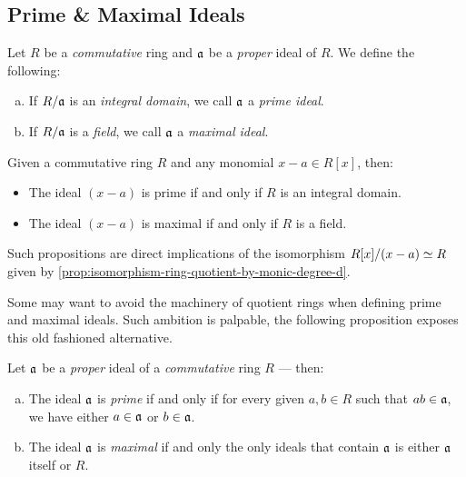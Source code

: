 \subsection{Prime \& Maximal Ideals}

\begin{definition}
    \label{def:prime-maximal-ideal}
    Let \(R\) be a \emph{commutative} ring and \(\mathfrak{a}\) be a \emph{proper}
    ideal of \(R\). We define the following:
    \begin{enumerate}[(a)]\setlength\itemsep{0em}
        \item If \(R/\mathfrak{a}\) is an \emph{integral domain}, we call \(\mathfrak{a}\) a
              \emph{prime ideal}.

        \item If \(R/\mathfrak{a}\) is a \emph{field}, we call \(\mathfrak{a}\) a
              \emph{maximal ideal}.
    \end{enumerate}
\end{definition}

\begin{example}
    \label{exp:prime-maximal-principal-ideal-of-R[x]}
    Given a commutative ring \(R\) and any monomial \(x - a \in R[x]\), then:
    \begin{itemize}\setlength\itemsep{0em}
        \item The ideal \((x - a)\) is prime if and only if \(R\) is an integral
              domain.
        \item The ideal \((x - a)\) is maximal if and only if \(R\) is a field.
    \end{itemize}
    Such propositions are direct implications of the isomorphism
    \(R[x]/(x - a) \simeq R\) given by
    \cref{prop:isomorphism-ring-quotient-by-monic-degree-d}.
\end{example}

Some may want to avoid the machinery of quotient rings when defining prime and
maximal ideals. Such ambition is palpable, the following proposition exposes
this old fashioned alternative.

\begin{proposition}
    \label{prop:equivalent-prime-maximal-ideals}
    Let \(\mathfrak{a}\) be a \emph{proper} ideal of a \emph{commutative} ring
    \(R\) --- then:
    \begin{enumerate}[(a)]\setlength\itemsep{0em}
        \item The ideal \(\mathfrak{a}\) is \emph{prime} if and only if for every given
              \(a, b \in R\) such that \(a b \in \mathfrak{a}\), we have either \(a \in
              \mathfrak{a}\) or \(b \in \mathfrak{a}\).

        \item The ideal \(\mathfrak{a}\) is \emph{maximal} if and only the only ideals
              that contain \(\mathfrak{a}\) is either \(\mathfrak{a}\) itself or \(R\).
    \end{enumerate}
\end{proposition}

